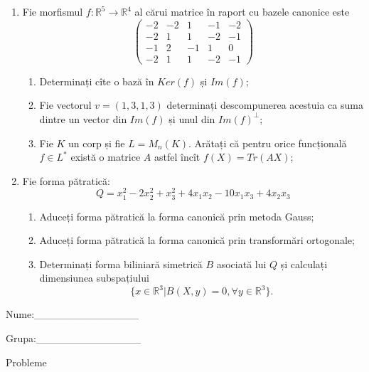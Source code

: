 \documentclass{article}
\begin{document}
\begin{enumerate}
 \item Fie morfismul $f:\mathbb{R}^5 \to \mathbb{R}^4$ al cărui matrice în raport cu bazele canonice este
$$\begin{pmatrix}
-2&-2&1&-1&-2\\
-2&1&1&-2&-1\\
-1&2&-1&1&0\\
-2&1&1&-2&-1
\end{pmatrix}$$

\begin{enumerate}
\item Determinați cîte o bază în $Ker(f)$ și $Im(f)$;
\item Fie vectorul $v=(1,3,1,3)$ determinați descompunerea acestuia ca suma dintre un vector din $Im(f)$ și unul din $Im(f)^\perp$;
\item Fie $K$ un corp și fie $L=M_n(K)$. Arătați că pentru orice funcțională $f \in L^*$ există o matrice $A$ astfel încît $f(X)=Tr(AX)$;
\end{enumerate}
\item Fie forma pătratică:
$$Q= x_1^2-2x_2^2+x_3^2+4x_1x_2-10x_1x_3+4x_2x_3$$

\begin{enumerate}
\item Aduceți forma pătratică la forma canonică prin metoda Gauss;
\item Aduceți forma pătratică la forma canonică prin transformări ortogonale;
\item Determinați forma biliniară simetrică $B$ asociată lui $Q$ și calculați dimensiunea subspațiului
$$\{x \in \mathbb{R}^3 | B(X,y)=0,\forall y \in \mathbb{R}^3\}.$$

\end{enumerate}
\end{enumerate}
\newpage
\begin{flushright}
Nume:\_\_\_\_\_\_\_\_\_\_\_\_\_\_
 
 
Grupa:\_\_\_\_\_\_\_\_\_\_\_\_\_\_
\end{flushright}
\begin{center}
\vspace{2cm}
{\Large Probleme}
\vspace{2cm}
\end{center}
\end{document}
